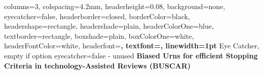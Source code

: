 \documentclass[a0paper,portrait]{baposter}
\begin{document}

\background{
}

\begin{poster}{
	columns=3,
	colspacing=4.2mm,
	headerheight=0.08\textheight,
	background=none,
	eyecatcher=false,
	headerborder=closed,
	borderColor=black,
	headershape=rectangle,
	headershade=plain,
	headerColorOne=blue,
	textborder=rectangle,
	boxshade=plain,
	boxColorOne=white,
	headerFontColor=white,
	headerfont=\color{white}\large\bfseries\sffamily,
	textfont=\larger\sffamily,
	linewidth=1pt
}
{
	Eye Catcher, empty if option eyecatcher=false - unused
}
{\sf\bf
	Biased Urns for efficient Stopping Criteria in technology-Assisted Reviews (BUSCAR)
}
{

}
{
\setlength\fboxsep{0pt}
\setlength\fboxrule{0pt}
}



\end{poster}
\end{document}
